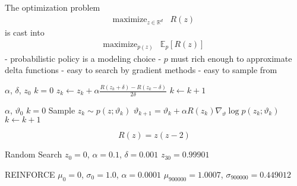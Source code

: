 \documentclass[aspectratio=169,8pt]{beamer}
\newcommand{\R}{\mathbb{R}}
\begin{document}
The optimization problem
\begin{equation*}
\begin{array}{ll}
	\mbox{maximize}_{z\in\R^d} & R(z) \,
\end{array}
\end{equation*}
is cast into
\begin{equation*}
\begin{array}{ll}
	\mbox{maximize}_{p(z)} & \mathbb{E}_p[R(z)] \,
\end{array}
\end{equation*}
- probabilistic policy is a modeling choice \newline
- $p$ must rich enough to approximate delta functions \newline
- easy to search by gradient methods \newline
- easy to sample from \newline
\eframe

\begin{algorithmic}
 $\alpha$, $\delta$, $z_0$
 $k = 0$
\STATE $z_k \leftarrow z_k + \alpha \frac{R(z_k + \delta) - R(z_k - \delta)}{2 \delta}$
\STATE $k\leftarrow k + 1$
\ENDWHILE
\end{algorithmic}
\eframe

\begin{algorithmic}
 $\alpha$, $\vartheta_0$
 $k = 0$
\STATE Sample $z_k\sim p(z;\vartheta_k)$
\STATE $\vartheta_{k+1} = \vartheta_k + \alpha R(z_k) \nabla_\vartheta \log p(z_k; \vartheta_k)$
\STATE $k\leftarrow k + 1$
\ENDWHILE
\end{algorithmic}
\eframe

\begin{equation*}
  R(z) = z (z - 2)
\end{equation*}

Random Search \newline
$z_0 = 0$, $\alpha = 0.1$, $\delta = 0.001$ \newline
$z_{30} = 0.99901$ \newline

REINFORCE \newline
$\mu_0 = 0$, $\sigma_0 = 1.0$, $\alpha = 0.0001$ \newline
$\mu_{900000} = 1.0007$,  $\sigma_{900000} = 0.449012$ \newline
\end{document}

